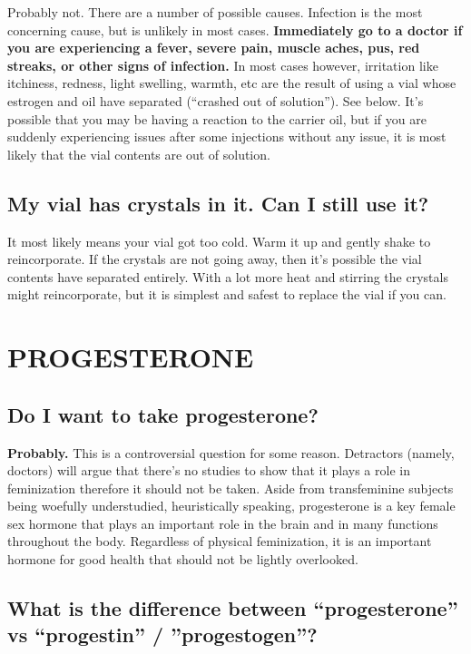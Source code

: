 \documentclass{article}
\begin{document}
Probably not. There are a number of possible causes. Infection is the most concerning cause, but is unlikely in most cases. \textbf{Immediately go to a doctor if you are experiencing a fever, severe pain, muscle aches, pus, red streaks, or other signs of infection.} In most cases however, irritation like itchiness, redness, light swelling, warmth, etc are the result of using a vial whose estrogen and oil have separated (“crashed out of solution”). See below. It’s possible that you may be having a reaction to the carrier oil, but if you are suddenly experiencing issues after some injections without any issue, it is most likely that the vial contents are out of solution.

\subsection{My vial has crystals in it. Can I still use it?}

It most likely means your vial got too cold. Warm it up and gently shake to reincorporate. If the crystals are not going away, then it’s possible the vial contents have separated entirely. With a lot more heat and stirring the crystals might reincorporate, but it is simplest and safest to replace the vial if you can.



\section{PROGESTERONE}

\subsection{Do I want to take progesterone?}

\textbf{Probably.} This is a controversial question for some reason. Detractors (namely, doctors) will argue that there’s no studies to show that it plays a role in feminization therefore it should not be taken. Aside from transfeminine subjects being woefully understudied, heuristically speaking, progesterone is a key female sex hormone that plays an important role in the brain and in many functions throughout the body. Regardless of physical feminization, it is an important hormone for good health that should not be lightly overlooked.

\subsection{What is the difference between “progesterone” vs “progestin” / ”progestogen”?}
\end{document}
